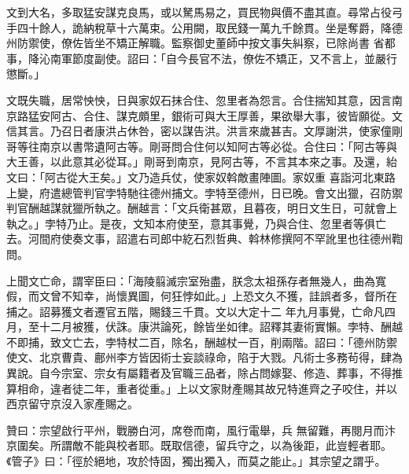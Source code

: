 \begin{pinyinscope}
 文到大名，多取猛安謀克良馬，或以駑馬易之，買民物與價不盡其直。尋常占役弓手四十餘人，詭納稅草十六萬束。公用闕，取民錢一萬九千餘貫。坐是奪爵，降德州防禦使，僚佐皆坐不矯正解職。監察御史董師中按文事失糾察，已除尚書
 省都事，降沁南軍節度副使。詔曰：「自今長官不法，僚佐不矯正，又不言上，並嚴行懲斷。」



 文既失職，居常怏怏，日與家奴石抹合住、忽里者為怨言。合住揣知其意，因言南京路猛安阿古、合住、謀克頗里，銀術可與大王厚善，果欲舉大事，彼皆願從。文信其言。乃召日者康洪占休咎，密以謀告洪。洪言來歲甚吉。文厚謝洪，使家僮剛哥等往南京以書幣遺阿古等。剛哥問合住何以知阿古等必從。合住曰：「阿古等與大王善，以此意其必從耳。」剛哥到南京，見阿古等，不言其本來之事。及還，紿文曰：「阿古從大王矣。」文乃造兵仗，使家奴斡敵畫陣圖。家奴重
 喜詣河北東路上變，府遣總管判官孛特馳往德州捕文。孛特至德州，日已晚。會文出獵，召防禦判官酬越謀就獵所執之。酬越言：「文兵衛甚眾，且暮夜，明日文生日，可就會上執之。」孛特乃止。是夜，文知本府使至，意其事覺，乃與合住、忽里者等俱亡去。河間府使奏文事，詔遣右司郎中紇石烈哲典、斡林修撰阿不罕訛里也往德州鞫問。



 上聞文亡命，謂宰臣曰：「海陵翦滅宗室殆盡，朕念太祖孫存者無幾人，曲為寬假，而文曾不知幸，尚懷異圖，何狂悖如此。」上恐文久不獲，詿誤者多，督所在捕之。詔募獲文者遷官五階，賜錢三千貫。文以大定十二
 年九月事覺，亡命凡四月，至十二月被獲，伏誅。康洪論死，餘皆坐如律。詔釋其妻術實懶。孛特、酬越不即捕，致文亡去，孛特杖二百，除名，酬越杖一百，削兩階。詔曰：「德州防禦使文、北京曹貴、鄜州李方皆因術士妄談祿命，陷于大戮。凡術士多務茍得，肆為異說。自今宗室、宗女有屬籍者及官職三品者，除占問嫁娶、修造、葬事，不得推算相命，違者徒二年，重者從重。」上以文家財產賜其故兄特進齊之子咬住，并以西京留守京沒入家產賜之。



 贊曰：宗望啟行平州，戰勝白河，席卷而南，風行電舉，兵
 無留難，再閱月而汴京圍矣。所謂敵不能與校者耶。既取信德，留兵守之，以為後距，此豈輕者耶。《管子》曰：「徑於絕地，攻於恃固，獨出獨入，而莫之能止。」其宗望之謂乎。



\end{pinyinscope}
